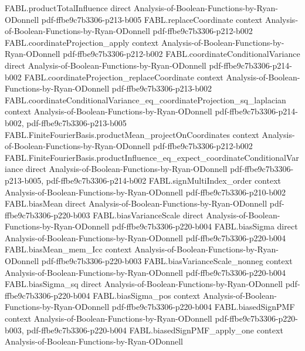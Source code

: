 \begin{theorem}
\proofstep
  {FABL.productTotalInfluence}
  {direct}
  {Analysis-of-Boolean-Functions-by-Ryan-ODonnell}
  {pdf-ffbe9c7b3306-p213-b005}
\proofstep
  {FABL.replaceCoordinate}
  {context}
  {Analysis-of-Boolean-Functions-by-Ryan-ODonnell}
  {pdf-ffbe9c7b3306-p212-b002}
\proofstep
  {FABL.coordinateProjection_apply}
  {context}
  {Analysis-of-Boolean-Functions-by-Ryan-ODonnell}
  {pdf-ffbe9c7b3306-p212-b002}
\proofstep
  {FABL.coordinateConditionalVariance}
  {direct}
  {Analysis-of-Boolean-Functions-by-Ryan-ODonnell}
  {pdf-ffbe9c7b3306-p214-b002}
\proofstep
  {FABL.coordinateProjection_replaceCoordinate}
  {context}
  {Analysis-of-Boolean-Functions-by-Ryan-ODonnell}
  {pdf-ffbe9c7b3306-p213-b002}
\proofstep
  {FABL.coordinateConditionalVariance_eq_coordinateProjection_sq_laplacian}
  {context}
  {Analysis-of-Boolean-Functions-by-Ryan-ODonnell}
  {pdf-ffbe9c7b3306-p214-b002,
    pdf-ffbe9c7b3306-p213-b005}
\proofstep
  {FABL.FiniteFourierBasis.productMean_projectOnCoordinates}
  {context}
  {Analysis-of-Boolean-Functions-by-Ryan-ODonnell}
  {pdf-ffbe9c7b3306-p212-b002}
\proofstep
  {FABL.FiniteFourierBasis.productInfluence_eq_expect_coordinateConditionalVariance}
  {direct}
  {Analysis-of-Boolean-Functions-by-Ryan-ODonnell}
  {pdf-ffbe9c7b3306-p213-b005,
    pdf-ffbe9c7b3306-p214-b002}
\proofstep
  {FABL.signMultiIndex_order}
  {context}
  {Analysis-of-Boolean-Functions-by-Ryan-ODonnell}
  {pdf-ffbe9c7b3306-p210-b002}
\proofstep
  {FABL.biasMean}
  {direct}
  {Analysis-of-Boolean-Functions-by-Ryan-ODonnell}
  {pdf-ffbe9c7b3306-p220-b003}
\proofstep
  {FABL.biasVarianceScale}
  {direct}
  {Analysis-of-Boolean-Functions-by-Ryan-ODonnell}
  {pdf-ffbe9c7b3306-p220-b004}
\proofstep
  {FABL.biasSigma}
  {direct}
  {Analysis-of-Boolean-Functions-by-Ryan-ODonnell}
  {pdf-ffbe9c7b3306-p220-b004}
\proofstep
  {FABL.biasMean_mem_Icc}
  {context}
  {Analysis-of-Boolean-Functions-by-Ryan-ODonnell}
  {pdf-ffbe9c7b3306-p220-b003}
\proofstep
  {FABL.biasVarianceScale_nonneg}
  {context}
  {Analysis-of-Boolean-Functions-by-Ryan-ODonnell}
  {pdf-ffbe9c7b3306-p220-b004}
\proofstep
  {FABL.biasSigma_sq}
  {direct}
  {Analysis-of-Boolean-Functions-by-Ryan-ODonnell}
  {pdf-ffbe9c7b3306-p220-b004}
\proofstep
  {FABL.biasSigma_pos}
  {context}
  {Analysis-of-Boolean-Functions-by-Ryan-ODonnell}
  {pdf-ffbe9c7b3306-p220-b004}
\proofstep
  {FABL.biasedSignPMF}
  {context}
  {Analysis-of-Boolean-Functions-by-Ryan-ODonnell}
  {pdf-ffbe9c7b3306-p220-b003,
    pdf-ffbe9c7b3306-p220-b004}
\proofstep
  {FABL.biasedSignPMF_apply_one}
  {context}
  {Analysis-of-Boolean-Functions-by-Ryan-ODonnell}

\end{theorem}
